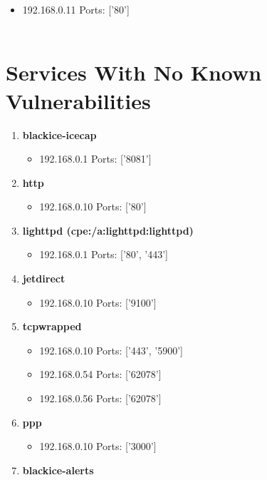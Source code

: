 \documentclass{article}
\begin{document}
\begin{enumerate}[wide, labelwidth=!, labelindent=0pt,
                        label=\textbf{\large \arabic{enumi} \large}]
                         \begin{itemize}
\item 192.168.0.11 Ports: ['80']
\\ \\ 
 \end{itemize}
\end{enumerate}
\section*{Services With No Known Vulnerabilities}\begin{enumerate}[wide, labelwidth=!, labelindent=0pt,
        label=\textbf{\large \arabic{enumi} \large}]
\item \textbf{\large blackice-icecap  \large}
\begin{itemize}
\item 192.168.0.1 Ports: ['8081']
\end{itemize}
\item \textbf{\large http  \large}
\begin{itemize}
\item 192.168.0.10 Ports: ['80']
\end{itemize}
\item \textbf{\large lighttpd (cpe:/a:lighttpd:lighttpd)  \large}
\begin{itemize}
\item 192.168.0.1 Ports: ['80', '443']
\end{itemize}
\item \textbf{\large jetdirect  \large}
\begin{itemize}
\item 192.168.0.10 Ports: ['9100']
\end{itemize}
\item \textbf{\large tcpwrapped  \large}
\begin{itemize}
\item 192.168.0.10 Ports: ['443', '5900']
\item 192.168.0.54 Ports: ['62078']
\item 192.168.0.56 Ports: ['62078']
\end{itemize}
\item \textbf{\large ppp  \large}
\begin{itemize}
\item 192.168.0.10 Ports: ['3000']
\end{itemize}
\item \textbf{\large blackice-alerts  \large}
\begin{itemize}

\end{itemize}
\end{enumerate}
\end{document}
